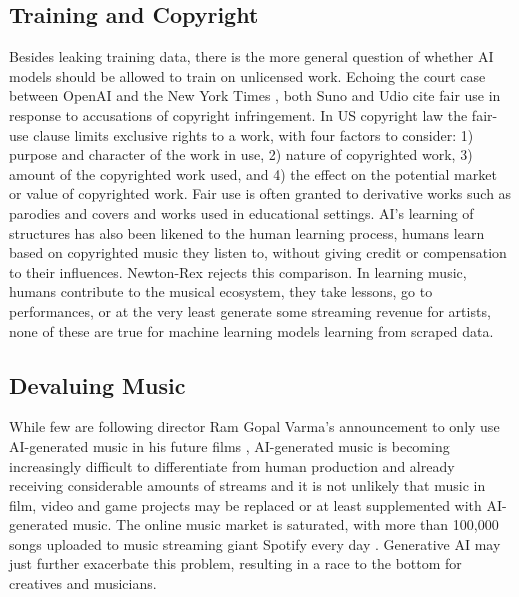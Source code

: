 \subsection{Training and Copyright}
Besides leaking training data, there is the more general question of whether AI models should be allowed to train on unlicensed work. Echoing the court case between OpenAI and the New York Times \cite{Reed_2024}, both Suno and Udio cite fair use in response to accusations of copyright infringement. In US copyright law the fair-use clause limits exclusive rights to a work, with four factors to consider: 1) purpose and character of the work in use, 2) nature of copyrighted work, 3) amount of the copyrighted work used, and 4) the effect on the potential market or value of copyrighted work.\cite{copyrightlaw}   Fair use is often granted to derivative works such as parodies and covers and works used in educational settings. AI’s learning of structures has also been likened to the human learning process, humans learn based on copyrighted music they listen to, without giving credit or compensation to their influences. Newton-Rex \cite{Newton-Rex_2024} rejects this comparison. In learning music, humans contribute to the musical ecosystem, they take lessons, go to performances, or at the very least generate some streaming revenue for artists, none of these are true for machine learning models learning from scraped data. 

\subsection{Devaluing Music}
While few are following director Ram Gopal Varma’s announcement to only use AI-generated music in his future films \cite{Singh_2024}, AI-generated music is becoming increasingly difficult to differentiate from human production and already receiving considerable amounts of streams and it is not unlikely that music in film, video and game projects may be replaced or at least supplemented with AI-generated music. The online music market is saturated, with more than 100,000 songs uploaded to music streaming giant Spotify every day \cite{Stassen_2023}. Generative AI may just further exacerbate this problem, resulting in a race to the bottom for creatives and musicians. 


